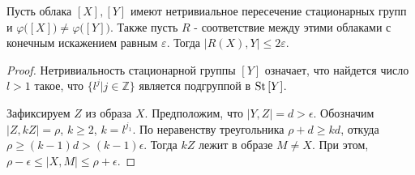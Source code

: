 \begin{theorem}
  Пусть облака $[X],[Y]$ имеют нетривиальное пересечение стационарных
  групп и $\varphi\big([X]\big)\neq \varphi\big([Y]\big)$. Также
  пусть $ R $ - соответствие между этими облаками с конечным
  искажением равным $ \varepsilon $. Тогда $ \big|R(X),Y\big| \le
  2\varepsilon $.

\end{theorem}
\begin{proof}
  Нетривиальность стационарной группы $[Y]$ означает, что найдется
  число $l > 1$ такое, что $\{l^{j}|j\in \mathbb{Z}\}$ является подгруппой в
  $\operatorname{St}{[Y]}$.

  Зафиксируем $Z$ из образа $X$.
  Предположим, что $|Y,Z| = d > \epsilon$.  Обозначим
  $|Z, kZ| = \rho$, $k \ge 2$, $k = l^{j_{1}}$. По неравенству
  треугольника $\rho + d \ge kd$,
  откуда $\rho \ge (k-1)d > (k-1)\epsilon$. Тогда $kZ$ лежит в образе
  $M \ne X$. При этом,
  $\rho - \epsilon \le |X, M| \le \rho + \epsilon$.


\end{proof}
